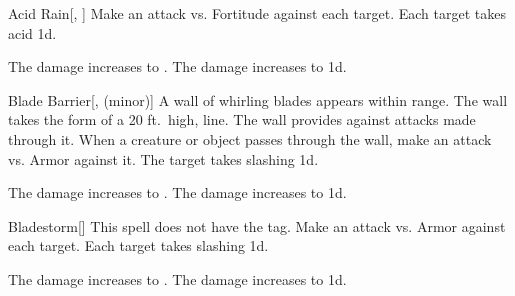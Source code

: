 \lowercase{\hypertarget{spell:Acid Rain}{}}\label{spell:Acid Rain}
\begin{freeability}[Rank 3]{\hypertarget{spell:Acid Rain}{Acid Rain}}[, ]
Make an attack vs. Fortitude against each target.
\hit Each target takes acid  \minus1d.

\rankline
{} The damage increases to .
 The damage increases to  \plus1d.
\end{freeability}
\vspace{0.25em}



\lowercase{\hypertarget{spell:Blade Barrier}{}}\label{spell:Blade Barrier}
\begin{freeability}[Rank 3]{\hypertarget{spell:Blade Barrier}{Blade Barrier}}[,  (minor)]
A wall of whirling blades appears within \rngmed range.
The wall takes the form of a 20 ft.\ high, \arealarge line.
The wall provides  against attacks made through it.
When a creature or object passes through the wall, make an attack vs. Armor against it.
\hit The target takes slashing  \minus1d.

\rankline
{} The damage increases to .
 The damage increases to  \plus1d.
\end{freeability}
\vspace{0.25em}



\lowercase{\hypertarget{spell:Bladestorm}{}}\label{spell:Bladestorm}
\begin{freeability}[Rank 3]{\hypertarget{spell:Bladestorm}{Bladestorm}}[]
This spell does not have the  tag.
Make an attack vs. Armor against each target.
\hit Each target takes slashing  \minus1d.

\rankline
{} The damage increases to .
 The damage increases to  \plus1d.
\end{freeability}
\vspace{0.25em}



